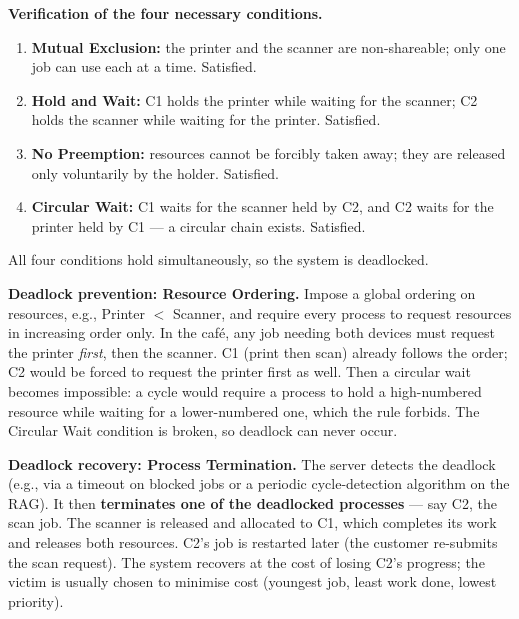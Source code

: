 \documentclass[11pt]{article}
\begin{document}
\textbf{Verification of the four necessary conditions.}
\begin{enumerate}
    \item \textbf{Mutual Exclusion:} the printer and the scanner are non-shareable; only one job can use each at a time. Satisfied.
    \item \textbf{Hold and Wait:} C1 holds the printer while waiting for the scanner; C2 holds the scanner while waiting for the printer. Satisfied.
    \item \textbf{No Preemption:} resources cannot be forcibly taken away; they are released only voluntarily by the holder. Satisfied.
    \item \textbf{Circular Wait:} C1 waits for the scanner held by C2, and C2 waits for the printer held by C1 — a circular chain exists. Satisfied.
\end{enumerate}
All four conditions hold simultaneously, so the system is deadlocked.

\textbf{Deadlock prevention: Resource Ordering.} Impose a global ordering on resources, e.g., Printer $<$ Scanner, and require every process to request resources in increasing order only. In the café, any job needing both devices must request the printer \emph{first}, then the scanner. C1 (print then scan) already follows the order; C2 would be forced to request the printer first as well. Then a circular wait becomes impossible: a cycle would require a process to hold a high-numbered resource while waiting for a lower-numbered one, which the rule forbids. The Circular Wait condition is broken, so deadlock can never occur.

\textbf{Deadlock recovery: Process Termination.} The server detects the deadlock (e.g., via a timeout on blocked jobs or a periodic cycle-detection algorithm on the RAG). It then \textbf{terminates one of the deadlocked processes} — say C2, the scan job. The scanner is released and allocated to C1, which completes its work and releases both resources. C2's job is restarted later (the customer re-submits the scan request). The system recovers at the cost of losing C2's progress; the victim is usually chosen to minimise cost (youngest job, least work done, lowest priority).
\end{document}
